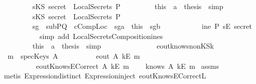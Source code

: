\begin{isabellebody}
\ \ \ \ \ \ \ \ \isamarkupfalse \ {\isachardoublequoteopen}sKS\ secret\ {\isasymin}\ LocalSecrets\ P{\isachardoublequoteclose}\isanewline
\ \ \ \ \ \ \ \ \isamarkupfalse \ this\ \ a{}\ \isamarkupfalse \ {\isacharquery}thesis\ \isamarkupfalse \ simp\isanewline
\ \ \ \ \ \ \isamarkupfalse \isanewline
\ \ \ \ \ \ \ \ \isamarkupfalse \ {\isachardoublequoteopen}sKS\ secret\ {\isasymnotin}\ LocalSecrets\ P{\isachardoublequoteclose}\isanewline
\ \ \ \ \ \ \ \ \isamarkupfalse \ sg{}\ \ subPQ\ \ cCompLoc\ \ sg{}a\ \ this\ \ sg{}b\ \isamarkupfalse \ \isanewline
\ \ \ \ \ \ \ \ \ {\isachardoublequoteopen}ine\ P\ {\isacharparenleft}sE\ secret{\isacharparenright}{\isachardoublequoteclose}\isanewline
\ \ \ \ \ \ \ \ \ \ \isamarkupfalse \ {\isacharparenleft}simp\ add{\isacharcolon}\ LocalSecretsComposition{\isacharunderscore}ine{}{\isacharunderscore}s{\isacharparenright}\isanewline
\ \ \ \ \ \ \ \ \isamarkupfalse \ this\ \ a{}\ \isamarkupfalse \ {\isacharquery}thesis\ \isamarkupfalse \ simp\isanewline
\ \ \ \ \ \ \isamarkupfalse \isanewline
\ \ \ \ \isamarkupfalse \isanewline
\ \ \isamarkupfalse \isanewline
{}\isamarkupfalse \endisatagproof
{\isafoldproof}\isadelimproof
\isanewline
\endisadelimproof
\isanewline
{}\isamarkupfalse \ eout{\isacharunderscore}knows{\isacharunderscore}nonKS{\isacharunderscore}k{\isacharcolon}\isanewline
\ \ {\isachardoublequoteopen}m\ {\isasymnotin}\ {\isacharparenleft}specKeys\ A{\isacharparenright}{\isachardoublequoteclose}\isanewline
\ \ \ \ \ \ \ \ \ \ {\isachardoublequoteopen}eout\ A\ {\isacharparenleft}kE\ m{\isacharparenright}{\isachardoublequoteclose}\isanewline
\ \ \ \ \ \ \ \ \ \ {\isachardoublequoteopen}eoutKnowsECorrect\ A\ {\isacharparenleft}kE\ m{\isacharparenright}{\isachardoublequoteclose}\isanewline
\ \ \ \ {\isachardoublequoteopen}knows\ A\ {\isacharbrackleft}kE\ m{\isacharbrackright}{\isachardoublequoteclose}\isanewline
\isadelimproof
\endisadelimproof
\isatagproof
{}\isamarkupfalse \ assms\isanewline
{}\isamarkupfalse \ {\isacharparenleft}metis\ Expression{\isachardot}distinct{\isacharparenleft}{}{\isacharparenright}\ Expression{\isachardot}inject{\isacharparenleft}{}{\isacharparenright}\ eoutKnowsECorrect{\isacharunderscore}L{}{\isacharparenright}\endisatagproof

\end{isabellebody}
